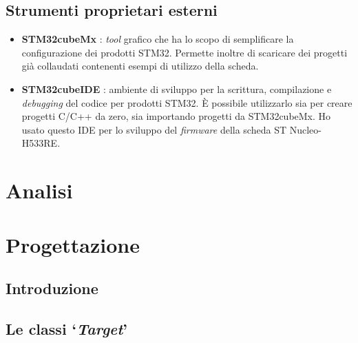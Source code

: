 \subsection{Strumenti proprietari esterni}
\begin{itemize}
	\item \textbf{STM32cubeMx} : \textit{tool} grafico che ha lo scopo di semplificare la configurazione dei prodotti STM32.
	Permette inoltre di scaricare dei progetti già collaudati contenenti esempi di utilizzo della scheda.

\item \textbf{STM32cubeIDE} : ambiente di sviluppo per la scrittura, compilazione e \textit{debugging} del codice per prodotti STM32.
È possibile utilizzarlo sia per creare progetti C/C++ da zero, sia importando progetti da STM32cubeMx.
Ho usato questo IDE per lo sviluppo del \textit{firmware} della scheda ST Nucleo-H533RE.
\end{itemize}



\section{Analisi} \label{sec:analisi}
\noindent

\section{Progettazione}

\subsection{Introduzione}
\noindent

\subsection{Le classi `\textit{Target}'}
\noindent

